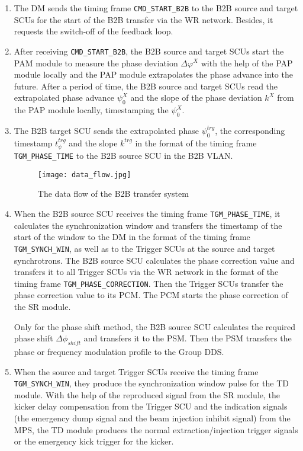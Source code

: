 \begin{enumerate}
\item The DM sends the timing frame \verb|CMD_START_B2B| to the B2B source and target SCUs for the start of the B2B transfer via the WR network. Besides, it requests the switch-off of the feedback loop.

\item  After receiving \verb|CMD_START_B2B|, the B2B source and target SCUs start the PAM module to measure the phase deviation $\Delta \varphi^X$ with the help of the PAP module locally and the PAP module extrapolates the phase advance into the future. After a period of time, the B2B source and target SCUs read the extrapolated phase advance $\psi^X_0$ and the slope of the phase deviation $k^\mathit{X}$ from the PAP module locally, timestamping the $\psi^X_0$.  

\item  The B2B target SCU sends the extrapolated phase $\psi^\mathit{trg}_0$, the corresponding timestamp $t_\psi^\mathit{trg}$ and the slope $k^\mathit{trg}$ in the format of the timing frame \verb|TGM_PHASE_TIME| to the B2B source SCU in the B2B VLAN. 
\begin{figure}[!htb]
   \centering   
   \texttt{[image: data\_flow.jpg]}
   \caption{The data flow of the B2B transfer system}
   \label{data_flow}
\end{figure}  

\item  When the B2B source SCU receives the timing frame \verb|TGM_PHASE_TIME|, it calculates the synchronization window and transfers the timestamp of the start of the window to the DM in the format of the timing frame \verb|TGM_SYNCH_WIN|, as well as to the Trigger SCUs at the source and target synchrotrons.
The B2B source SCU calculates the phase correction value and transfers it to all Trigger SCUs via the WR network in the format of the timing frame \verb|TGM_PHASE_CORRECTION|. Then the Trigger SCUs transfer the phase correction value to its \gls{PCM}. The PCM starts the phase correction of the SR module. 

Only for the phase shift method, the B2B source SCU calculates the required phase shift $\Delta \phi_\mathit{shift}$ and transfers it to the PSM. Then the PSM transfers the phase or frequency modulation profile to the Group DDS.  

\item  When the source and target Trigger SCUs receive the timing frame \verb|TGM_SYNCH_WIN|, they produce the synchronization window pulse for the TD module. With the help of the reproduced signal from the SR module, the kicker delay compensation from the Trigger SCU and the indication signals (the emergency dump signal and the beam injection inhibit signal) from the MPS, the TD module produces the normal extraction/injection trigger signals or the emergency kick trigger for the kicker.  


\end{enumerate}
